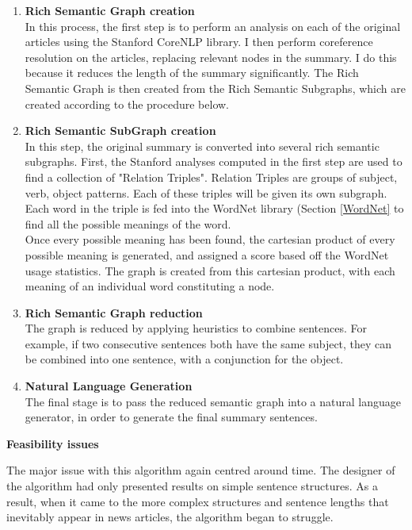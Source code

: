 \documentclass[12pt]{article}
\begin{document}
\begin{enumerate}
	\item \textbf{Rich Semantic Graph creation} \\ 
	In this process, the first step is to perform an analysis on each of the original articles using the Stanford CoreNLP \cite{corenlp} library. I then perform coreference resolution on the articles, replacing relevant nodes in the summary. I do this because it reduces the length of the summary significantly. The Rich Semantic Graph is then created from the Rich Semantic Subgraphs, which are created according to the procedure below. 
	\item \textbf{Rich Semantic SubGraph creation} \\
	In this step, the original summary is converted into several rich semantic subgraphs. First, the Stanford analyses computed in the first step are used to find a collection of "Relation Triples". Relation Triples are groups of subject, verb, object patterns. Each of these triples will be given its own subgraph. Each word in the triple is fed into the WordNet library \cite{wordnet} (Section \ref{WordNet} to find all the possible meanings of the word. \\
	Once every possible meaning has been found, the cartesian product of every possible meaning is generated, and assigned a score based off the WordNet usage statistics. The graph is created from this cartesian product, with each meaning of an individual word constituting a node. 
	\item \textbf{Rich Semantic Graph reduction} \\
	The graph is reduced by applying heuristics to combine sentences. For example, if two consecutive sentences both have the same subject, they can be combined into one sentence, with a conjunction for the object. 
	\item \textbf{Natural Language Generation}\\
	The final stage is to pass the reduced semantic graph into a natural language generator, in order to generate the final summary sentences.\\
\end{enumerate}

\textbf{Feasibility issues}

The major issue with this algorithm again centred around time. The designer of the algorithm had only presented results on simple sentence structures. As a result, when it came to the more complex structures and sentence lengths that inevitably appear in news articles, the algorithm began to struggle.
\end{document}
